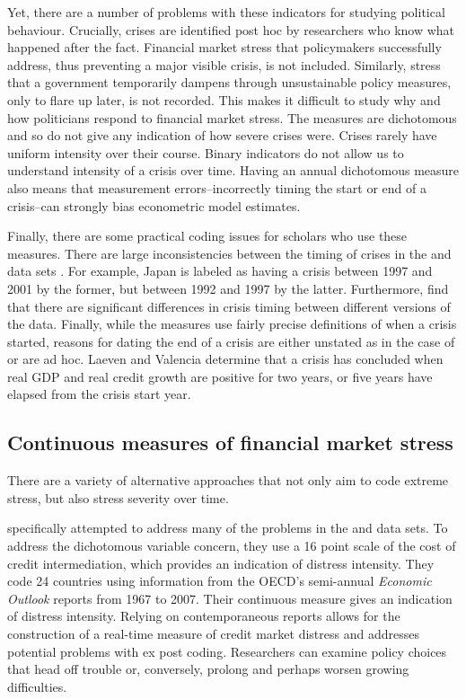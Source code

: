 \documentclass[]{article}
\begin{document}
Yet, there are a number of problems with these indicators for studying political behaviour. Crucially, crises are identified post hoc by researchers who know what happened after the fact. Financial market stress that policymakers successfully address, thus preventing a major visible crisis, is not included. Similarly, stress that a government temporarily dampens through unsustainable policy measures, only to flare up later, is not recorded. This makes it difficult to study why and how politicians respond to financial market stress. The measures are dichotomous and so do not give any indication of how severe crises were. Crises rarely have uniform intensity over their course. Binary indicators do not allow us to understand intensity of a crisis over time.  Having an annual dichotomous measure also means that measurement errors--incorrectly timing the start or end of a crisis--can strongly bias econometric model estimates.

Finally, there are some practical coding issues for scholars who use these measures. There are large inconsistencies between the timing of crises in the \cite{laeven2013} and \cite{Reinhart2009} data sets \citep{Chaudron2014}. For example, Japan is labeled as having a crisis between 1997 and 2001 by the former, but between 1992 and 1997 by the latter. Furthermore, \cite{GandrudHallerberg2015} find that there are significant differences in crisis timing between different versions of the \cite{laeven2013} data. Finally, while the measures use fairly precise definitions of when a crisis started, reasons for dating the end of a crisis are either unstated as in the case of \cite{Reinhart2009} or are ad hoc. Laeven and Valencia \citeyearpar[footnote 19]{laeven2013} determine that a crisis has concluded when real GDP and real credit growth are positive for two years, or five years have elapsed from the crisis start year.

\subsection{Continuous measures of financial market stress}

There are a variety of alternative approaches that not only aim to code extreme stress, but also stress severity over time.

\cite{Romer2015} specifically attempted to address many of the problems in the \cite{Reinhart2009} and \cite{laeven2013} data sets. To address the dichotomous variable concern, they use a 16 point scale of the cost of credit intermediation, which provides an indication of distress intensity. They code 24 countries using information from the OECD's semi-annual \emph{Economic Outlook} reports from 1967 to 2007. Their  continuous measure gives an indication of distress intensity. Relying on contemporaneous reports allows for the construction of a real-time measure of credit market distress and addresses potential problems with ex post coding. Researchers can examine policy choices that head off trouble or, conversely, prolong and perhaps worsen growing difficulties.
\end{document}
